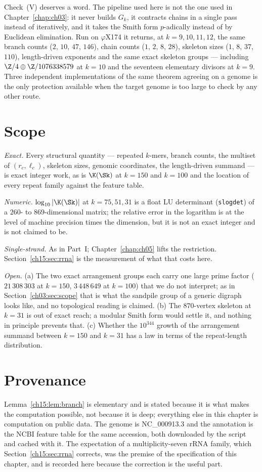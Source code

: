 Check~(V) deserves a word. The pipeline used here is not the one used in Chapter~\ref{chap:ch03}: it
never builds $G_k$, it contracts chains in a single pass instead of iteratively, and it
takes the Smith form $p$-adically instead of by Euclidean elimination. Run on
$\varphi$X174 it returns, at $k=9,10,11,12$, the same branch counts ($2$, $10$, $47$,
$146$), chain counts ($1$, $2$, $8$, $28$), skeleton sizes ($1$, $8$, $37$, $110$),
length-driven exponents and the same exact skeleton groups --- including
$\Z/4\oplus\Z/1076338579$ at $k=10$ and the seventeen elementary divisors at $k=9$. Three
independent implementations of the same theorem agreeing on a genome is the only
protection available when the target genome is too large to check by any other route.

\section{Scope}\label{ch15:sec:scope}

\emph{Exact.} Every structural quantity --- repeated $k$-mers, branch counts, the multiset
of $(r_c,\ell_c)$, skeleton sizes, genomic coordinates, the length-driven summand --- is
exact integer work, as is $\K(\Sk)$ at $k=150$ and $k=100$ and the location of every repeat
family against the feature table.

\emph{Numeric.} $\log_{10}|\K(\Sk)|$ at $k=75,51,31$ is a float LU determinant
(\texttt{slogdet}) of a $260$- to $869$-dimensional matrix; the relative error in the
logarithm is at the level of machine precision times the dimension, but it is not an
exact integer and is not claimed to be.

\emph{Single-strand.} As in Part~I; Chapter~\ref{chap:ch05} lifts the restriction. Section~\ref{ch15:sec:rrna} is the
measurement of what that costs here.

\emph{Open.} (a) The two exact arrangement groups each carry one large prime factor
($21\,308\,303$ at $k=150$, $3\,448\,649$ at $k=100$) that we do not interpret; as in
Section~\ref{ch03:sec:scope} that is what the sandpile group of a generic digraph looks like, and no
topological reading is claimed. (b) The $870$-vertex skeleton at $k=31$ is out of exact
reach; a modular Smith form would settle it, and nothing in principle prevents that.
(c) Whether the $10^{344}$ growth of the arrangement summand between $k=150$ and $k=31$
has a law in terms of the repeat-length distribution.

\section*{Provenance}

Lemma~\ref{ch15:lem:branch} is elementary and is stated because it is
what makes the computation possible, not because it is deep; everything else in this chapter
is computation on public data. The genome is NC\_000913.3 and the annotation is the NCBI
feature table for the same accession, both downloaded by the script and cached with it.
The expectation of a multiplicity-seven rRNA family, which Section~\ref{ch15:sec:rrna}
corrects, was the premise of the specification of this chapter, and is recorded here
because the correction is the useful part.
